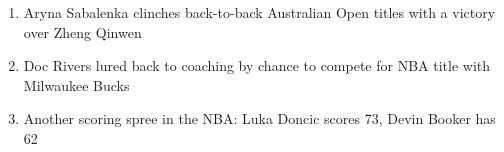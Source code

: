 \begin{enumerate}
\item Aryna Sabalenka clinches back-to-back Australian Open titles with a victory over Zheng Qinwen
\item Doc Rivers lured back to coaching by chance to compete for NBA title with Milwaukee Bucks
\item Another scoring spree in the NBA: Luka Doncic scores 73, Devin Booker has 62\end{enumerate}